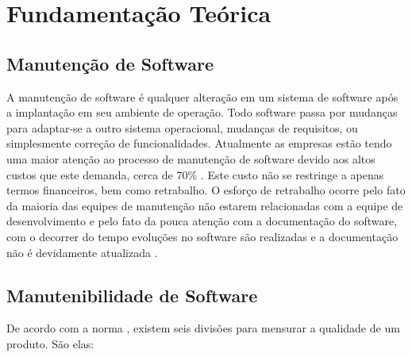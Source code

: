 \chapter{Fundamentação Teórica}\label{fundamentacao}

\section{Manutenção de Software}\label{manutencao}
A manutenção de software é qualquer alteração em um sistema de software após a implantação em seu ambiente de operação. Todo software passa por mudanças para adaptar-se a outro sistema operacional, mudanças de requisitos, ou simplesmente correção de funcionalidades. Atualmente as empresas estão tendo uma maior atenção ao processo de manutenção de software devido aos altos custos que este demanda, cerca de 70\% \cite{pressman2010} \cite{pigoski1997}. Este custo não se restringe a apenas termos financeiros, bem como retrabalho. O esforço de retrabalho ocorre pelo fato da maioria das equipes de manutenção não estarem relacionadas com a equipe de desenvolvimento e pelo fato da pouca atenção com a documentação do software, com o decorrer do tempo evoluções no software são realizadas e a documentação não é devidamente atualizada \cite{sergio2005}.

\section{Manutenibilidade de Software}
De acordo com a norma , existem seis divisões para mensurar a qualidade de um produto. São elas:

